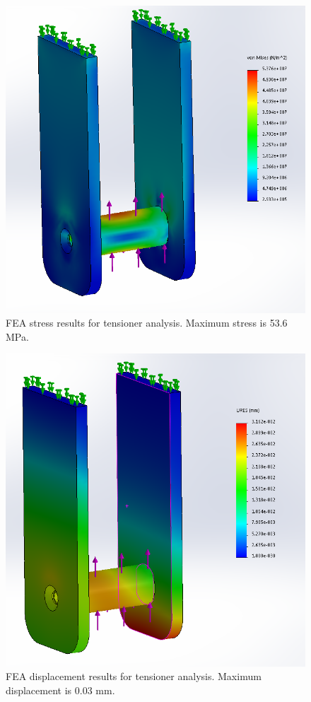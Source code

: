 \begin{figure}[H]
\centering
\includegraphics[width=\textwidth]{images/tensioner_vonmises_fea}
\caption[Tensioner FEA Stress Results]{FEA stress results for tensioner analysis. Maximum stress is 53.6 MPa.}
\label{fig:idler_fea1}
\end{figure}

\begin{figure}[H]
\centering
\includegraphics[width=\textwidth]{images/tensioner_displacement_fea}
\caption[Tensioner FEA Displacement Results]{FEA displacement results for tensioner analysis. Maximum displacement is 0.03 mm.}
\label{fig:idler_fea2}
\end{figure}

